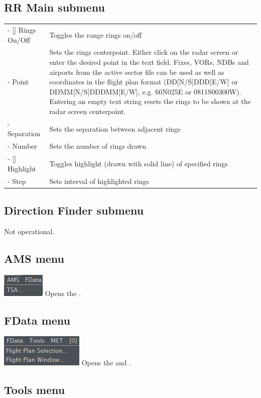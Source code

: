 \documentclass[11pt,a4paper,oldfontcommands]{memoir}
\begin{document}
\subsection*{RR Main submenu}
\begin{tabular}{l l}
    - [] Rings On/Off & Toggles the range rings on/off
    \\- Point & Sets the rings centerpoint. Either click on the radar screen or
    enter the desired point in the text field. Fixes, VORs, NDBs and
    airports from the active sector file can be used as well as
    coordinates in the flight plan format (DD[N/S]DDD[E/W] or
    DDMM[N/S]DDDMM[E/W], e.g. 60N025E or 0811S00300W).
    Entering an empty text string resets the rings to be shown at
    the radar screen centerpoint.
    \\- Separation & Sets the separation between adjacent rings
    \\- Number & Sets the number of rings drawn
    \\- [] Highlight & Toggles highlight (drawn with solid line) of specified rings
    \\- Step & Sets interval of highlighted rings
\end{tabular}
\medskip

\subsection*{Direction Finder submenu}
Not operational.

\subsection{AMS menu}
\includegraphics{img/AMS.png}
\medskip
Opens the \textit{}.

\subsection{FData menu}
\includegraphics{img/FData.png}
\medskip
Opens the \textit{} and \textit{}.

\subsection{Tools menu}
\end{document}
